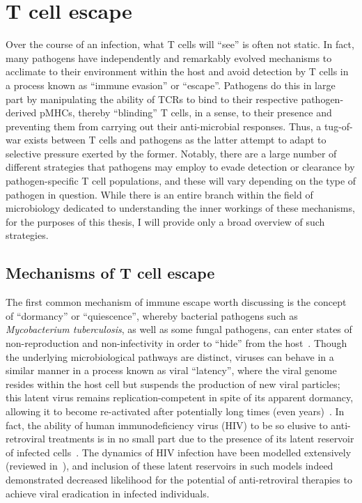 \section{T cell escape}
\label{sec:intro_immuneEscape}

Over the course of an infection, what T cells will ``see'' is often not static. In fact, many pathogens have independently and remarkably evolved mechanisms to acclimate to their environment within the host and avoid detection by T cells in a process known as ``immune evasion''  or ``escape''. Pathogens do this in large part by manipulating the ability of TCRs to bind to their respective pathogen-derived pMHCs, thereby ``blinding'' T cells, in a sense, to their presence and preventing them from carrying out their anti-microbial responses. Thus, a tug-of-war exists between T cells and pathogens as the latter attempt to adapt to selective pressure exerted by the former. Notably, there are a large number of different strategies that pathogens may employ to evade detection or clearance by pathogen-specific T cell populations, and these will vary depending on the type of pathogen in question. While there is an entire branch within the field of microbiology dedicated to understanding the inner workings of these mechanisms, for the purposes of this thesis, I will provide only a broad overview of such strategies. 

\subsection{Mechanisms of T cell escape}
\label{sec:intro_immuneEscape_mechanisms}

The first common mechanism of immune escape worth discussing is the concept of ``dormancy'' or ``quiescence'', whereby bacterial pathogens such as \textit{Mycobacterium tuberculosis}, as well as some fungal pathogens, can enter states of non-reproduction and non-infectivity in order to ``hide'' from the host~\cite{rittershaus2013normalcy,shepherd2020t,brunet2018reactivation}. Though the underlying microbiological pathways are distinct, viruses can behave in a similar manner in a process known as viral ``latency'', where the viral genome resides within the host cell but suspends the production of new viral particles; this latent virus remains replication-competent in spite of its apparent dormancy, allowing it to become re-activated after potentially long times (even years)~\cite{speck2010viral,eshleman2011varicella,delannoy2019cat,zangger2022t}. In fact, the ability of human immunodeficiency virus (HIV) to be so elusive to anti-retroviral treatments is in no small part due to the presence of its latent reservoir of infected cells~\cite{chun1999latent,delannoy2019cat}. The dynamics of HIV infection have been modelled extensively (reviewed in~\cite{perelson2002modelling,rong2009modeling,hill2018mathematical}), and inclusion of these latent reservoirs in such models indeed demonstrated decreased likelihood for the potential of anti-retroviral therapies to achieve viral eradication in infected individuals.

